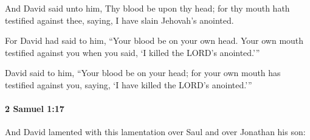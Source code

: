 			\begin{versebox}
					\item[BHS] 
					\item[ASV] And David said unto him, Thy blood be upon thy head; for thy mouth hath testified against thee, saying, I have slain Jehovah's anointed.
					\item[NIV] For David had said to him, “Your blood be on your own head. Your own mouth testified against you when you said, ‘I killed the LORD’s anointed.’”
					\item[NRSV] David said to him, “Your blood be on your head; for your own mouth has testified against you, saying, ‘I have killed the LORD’s anointed.’”
			\end{versebox}

		\paragraph{2 Samuel 1:17} %
			\label{2SAMUEL-1-17}

			And David lamented with this lamentation over Saul and over Jonathan his son:

